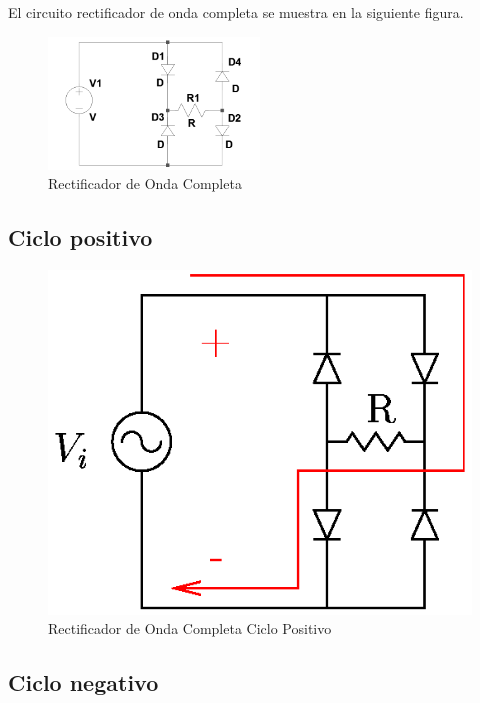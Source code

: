 \documentclass{article}
\begin{document}
El circuito rectificador de onda completa se muestra en la siguiente
figura.

\begin{figure}[htbp]
\centering
\includegraphics[width=0.5\textwidth]{images/puentededidos.png}
\caption{Rectificador de Onda Completa}
\end{figure}

\subsection{Ciclo positivo}\label{ciclo-positivo}

\begin{figure}[htbp]
\centering
\includegraphics{images/puentediodos2pos.png}
\caption{Rectificador de Onda Completa Ciclo Positivo}
\end{figure}

\subsection{Ciclo negativo}\label{ciclo-negativo}
\end{document}
